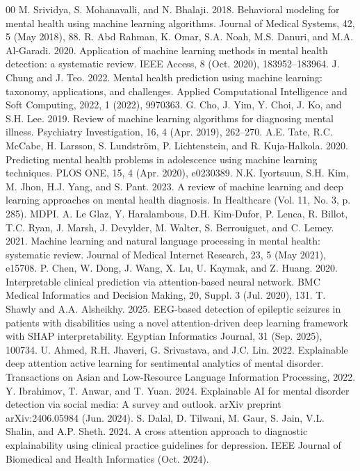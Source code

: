 \documentclass{article}
\begin{document}
\begin{thebibliography}{00}
 M. Srividya, S. Mohanavalli, and N. Bhalaji. 2018. Behavioral modeling for mental health using machine learning algorithms. Journal of Medical Systems, 42, 5 (May 2018), 88.
 R. Abd Rahman, K. Omar, S.A. Noah, M.S. Danuri, and M.A. Al-Garadi. 2020. Application of machine learning methods in mental health detection: a systematic review. IEEE Access, 8 (Oct. 2020), 183952--183964.
 J. Chung and J. Teo. 2022. Mental health prediction using machine learning: taxonomy, applications, and challenges. Applied Computational Intelligence and Soft Computing, 2022, 1 (2022), 9970363.
 G. Cho, J. Yim, Y. Choi, J. Ko, and S.H. Lee. 2019. Review of machine learning algorithms for diagnosing mental illness. Psychiatry Investigation, 16, 4 (Apr. 2019), 262--270.
 A.E. Tate, R.C. McCabe, H. Larsson, S. Lundström, P. Lichtenstein, and R. Kuja-Halkola. 2020. Predicting mental health problems in adolescence using machine learning techniques. PLOS ONE, 15, 4 (Apr. 2020), e0230389.
 N.K. Iyortsuun, S.H. Kim, M. Jhon, H.J. Yang, and S. Pant. 2023. A review of machine learning and deep learning approaches on mental health diagnosis. In Healthcare (Vol. 11, No. 3, p. 285). MDPI.
 A. Le Glaz, Y. Haralambous, D.H. Kim-Dufor, P. Lenca, R. Billot, T.C. Ryan, J. Marsh, J. Devylder, M. Walter, S. Berrouiguet, and C. Lemey. 2021. Machine learning and natural language processing in mental health: systematic review. Journal of Medical Internet Research, 23, 5 (May 2021), e15708.
 P. Chen, W. Dong, J. Wang, X. Lu, U. Kaymak, and Z. Huang. 2020. Interpretable clinical prediction via attention-based neural network. BMC Medical Informatics and Decision Making, 20, Suppl. 3 (Jul. 2020), 131.
 T. Shawly and A.A. Alsheikhy. 2025. EEG-based detection of epileptic seizures in patients with disabilities using a novel attention-driven deep learning framework with SHAP interpretability. Egyptian Informatics Journal, 31 (Sep. 2025), 100734.
 U. Ahmed, R.H. Jhaveri, G. Srivastava, and J.C. Lin. 2022. Explainable deep attention active learning for sentimental analytics of mental disorder. Transactions on Asian and Low-Resource Language Information Processing, 2022.
 Y. Ibrahimov, T. Anwar, and T. Yuan. 2024. Explainable AI for mental disorder detection via social media: A survey and outlook. arXiv preprint arXiv:2406.05984 (Jun. 2024).
 S. Dalal, D. Tilwani, M. Gaur, S. Jain, V.L. Shalin, and A.P. Sheth. 2024. A cross attention approach to diagnostic explainability using clinical practice guidelines for depression. IEEE Journal of Biomedical and Health Informatics (Oct. 2024).

\end{thebibliography}
\end{document}

